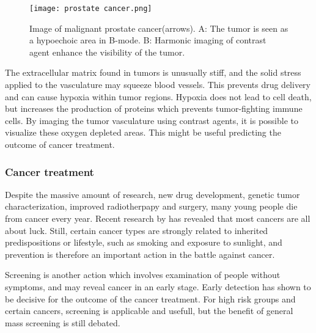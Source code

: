 \begin{figure}[h]
  \centering
  \texttt{[image: prostate cancer.png]}
  \caption{Image of malignant prostate cancer(arrows)\cite{Halpern2006}. A: The tumor is seen as a hypoechoic area in B-mode. B: Harmonic imaging of contrast agent enhance the visibility of the tumor.}
  \label{Fig:prostate cancer}
\end{figure}

The extracellular matrix found in tumors is unusually stiff, and the solid stress applied to the vasculature may  squeeze blood vessels. This prevents drug delivery and can cause hypoxia within tumor regions. Hypoxia does not lead to cell death, but increases the production of proteins which prevents tumor-fighting immune cells\cite{Jain2014}. By imaging the tumor vasculature using contrast agents, it is possible to visualize these oxygen depleted areas. This might be useful predicting the outcome of cancer treatment. 


\subsubsection{Cancer treatment}

Despite the massive amount of research, new drug development, genetic tumor characterization, improved radiotherpapy and surgery, many young people die from cancer every year. Recent research by \citet{Tomasetti2014} has revealed that most cancers are all about luck. Still, certain cancer types are strongly related to inherited predispositions or  lifestyle, such as smoking and exposure to sunlight, and prevention is therefore an important action in the battle against cancer.  

Screening is another action which involves examination of people without symptoms, and may reveal cancer in an early stage.  Early detection has shown to be decisive for the outcome of the cancer treatment\cite{king2006cancer}\cite{Jordan1986}. For high risk groups and certain cancers,  screening is applicable and usefull, but the benefit of general mass screening is still debated. 


